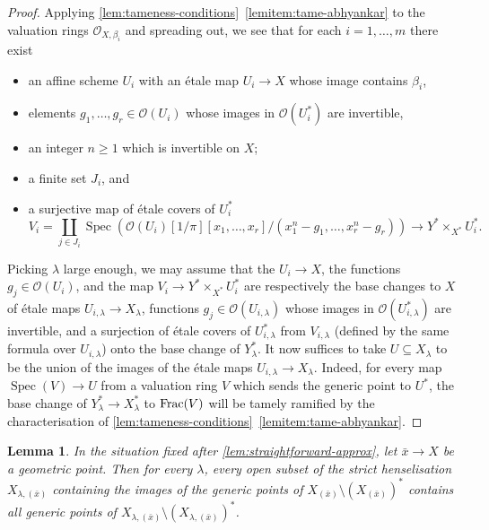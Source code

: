 \documentclass[a4paper,twoside,11pt,reqno]{amsart}
\newcommand{\cO}{{\mathcal O}}
\newcommand{\la}{\longrightarrow}
\DeclareMathOperator{\Spec}{Spec}
\newtheorem{lem}[thm]{Lemma}
\theoremstyle{definition}
\numberwithin{equation}{subsection}
\begin{document}
\begin{proof}
Applying \cref{lem:tameness-conditions}~\ref{lemitem:tame-abhyankar} to the valuation rings $\cO_{X,\beta_i}$ and spreading out, we see that for each $i=1,\dots, m$ there exist
\begin{itemize}
    \item 
    an affine scheme $U_i$ with an \'etale map $U_i\to X$ whose image contains $\beta_i$,
    \item 
    elements $g_1,\dots, g_r\in \cO(U_i)$ whose images in $\cO(U_i^*)$ are invertible,
    \item 
    an integer $n\geq 1$ which is invertible on $X$;
    \item 
    a finite set $J_i$, and  
    \item 
    a surjective map of \'etale covers of $U_i^*$
    \[
        V_i = \coprod_{j \in J_i} 
        \Spec(\cO(U_i)[1/\pi][x_1,\dots, x_r]/(x_1^{n} - g_1, \dots, x_r^{n} - g_r)) \la Y^*\times_{X^*} U^*_i. 
    \]
\end{itemize}
Picking $\lambda$ large enough, we may assume that the $U_i\to X$, the functions $g_j\in \cO(U_i)$, and the map $V_i\to Y^*\times_{X^*}U_i^*$ are respectively the base changes to $X$ of \'etale maps $U_{i,\lambda}\to X_\lambda$, functions $g_j\in \cO(U_{i,\lambda})$ whose images in $\cO(U_{i,\lambda}^*)$ are invertible, and a surjection of \'etale covers of $U_{i,\lambda}^*$ from $V_{i,\lambda}$ (defined by the same formula over $U_{i,\lambda}$) onto the base change of $Y^*_\lambda$. It now suffices to take $U \subseteq X_\lambda$ to be the union of the images of the \'etale maps $U_{i,\lambda}\to X_\lambda$. Indeed, for every map $\Spec(V)\to U$ from a valuation ring $V$ which sends the generic point to $U^*$, the base change of $Y^*_\lambda \to X^*_\lambda$ to ${\rm Frac}(V)$ will be tamely ramified by the characterisation of  \cref{lem:tameness-conditions}~\ref{lemitem:tame-abhyankar}.
\end{proof}

\begin{lem} \label{lem:generic-points-ugggh}
    In the situation fixed after  \cref{lem:straightforward-approx}, let $\bar x\to X$ be a geometric point. Then for every $\lambda$, every open subset of the strict henselisation $X_{\lambda,(\bar x)}$ containing the images of the generic points of $X_{(\bar x)}\setminus (X_{(\bar x)})^*$ contains all generic points of $X_{\lambda,(\bar x)} \setminus (X_{\lambda,(\bar x)})^*$.
\end{lem}
\end{document}
